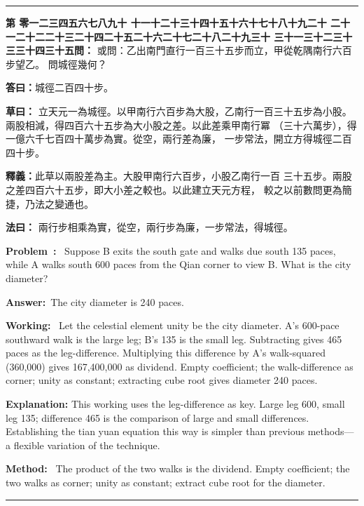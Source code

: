 \documentclass[9pt,a4paper]{article}
\newcounter{probnum}
\newcounter{overallnum}
\newcommand{\chnum}[1]{%
  \ifcase#1 零\or 一\or 二\or 三\or 四\or 五\or 六\or 七\or 八\or 九\or 十\or
    十一\or 十二\or 十三\or 十四\or 十五\or 十六\or 十七\or 十八\or 十九\or 二十\or
    二十一\or 二十二\or 二十三\or 二十四\or 二十五\or 二十六\or 二十七\or 二十八\or 二十九\or 三十\or
    三十一\or 三十二\or 三十三\or 三十四\or 三十五\fi}
\newcommand{\problem}[1]{\stepcounter{probnum}\stepcounter{overallnum}\par\noindent\textbf{\color{volcolor}第\chnum{\value{probnum}}問：}#1\par\vspace{0.15cm}}
\newcommand{\answer}[1]{\par\noindent\textbf{答曰：}#1\par\vspace{0.15cm}}
\newcommand{\working}[1]{\par\noindent\textbf{草曰：}#1\par\vspace{0.15cm}}
\newcommand{\method}[1]{\par\noindent\textbf{法曰：}#1\par\vspace{0.25cm}}
\newcommand{\eproblem}[1]{\par\noindent\textbf{\color{volcolor}Problem~\theoverallnum:}~#1\par\vspace{0.15cm}}
\newcommand{\eanswer}[1]{\par\noindent\textbf{Answer:}~#1\par\vspace{0.15cm}}
\newcommand{\eworking}[1]{\par\noindent\textbf{Working:}~#1\par\vspace{0.15cm}}
\newcommand{\emethod}[1]{\par\noindent\textbf{Method:}~#1\par\vspace{0.25cm}}
\begin{document}
\vspace{0.15cm}
\noindent\rule{\textwidth}{0.2pt}
\vspace{0.15cm}

\noindent\begin{minipage}[t]{0.48\textwidth}
\problem{
或問：乙出南門直行一百三十五步而立，甲從乾隅南行六百步望乙。
問城徑幾何？
}

\answer{城徑二百四十步。}

\working{
立天元一為城徑。以甲南行六百步為大股，乙南行一百三十五步為小股。
兩股相減，得四百六十五步為大小股之差。以此差乘甲南行冪
（三十六萬步），得一億六千七百四十萬步為實。從空，兩行差為廉，
一步常法，開立方得城徑二百四十步。

\textbf{釋義：}此草以兩股差為主。大股甲南行六百步，小股乙南行一百
三十五步。兩股之差四百六十五步，即大小差之較也。以此建立天元方程，
較之以前數問更為簡捷，乃法之變通也。
}

\method{
兩行步相乘為實，從空，兩行步為廉，一步常法，得城徑。
}
\end{minipage}%
\hfill%
\begin{minipage}[t]{0.50\textwidth}
\eproblem{
Suppose B exits the south gate and walks due south 135 paces, while A walks
south 600 paces from the Qian corner to view B. What is the city diameter?
}

\eanswer{The city diameter is 240 paces.}

\eworking{
Let the celestial element unity be the city diameter. A's 600-pace southward
walk is the large leg; B's 135 is the small leg. Subtracting gives 465 paces
as the leg-difference. Multiplying this difference by A's walk-squared
(360,000) gives 167,400,000 as dividend. Empty coefficient; the walk-difference
as corner; unity as constant; extracting cube root gives diameter 240 paces.

\textbf{Explanation:} This working uses the leg-difference as key. Large leg
600, small leg 135; difference 465 is the comparison of large and small
differences. Establishing the tian yuan equation this way is simpler than
previous methods---a flexible variation of the technique.
}

\emethod{
The product of the two walks is the dividend. Empty coefficient; the two
walks as corner; unity as constant; extract cube root for the diameter.
}
\end{minipage}
\vspace{0.15cm}

\vspace{0.15cm}
\noindent\rule{\textwidth}{0.2pt}
\vspace{0.15cm}
\end{document}
